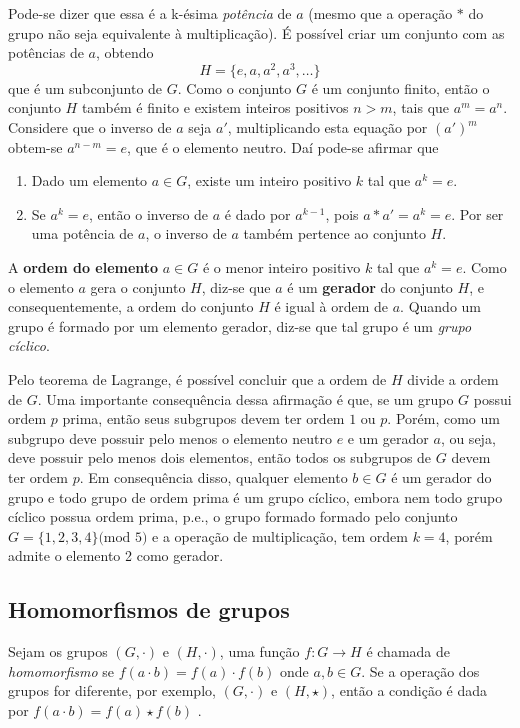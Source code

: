 Pode-se dizer que essa é a k-ésima \textit{potência} de $a$ (mesmo que a operação $*$ do grupo não seja equivalente à multiplicação). É possível criar um conjunto com as potências de $a$, obtendo
$$
H = \{e, a, a^2, a^3, \ldots\}
$$
que é um subconjunto de $G$. Como o conjunto $G$ é um conjunto finito, então o conjunto $H$ também é finito e existem inteiros positivos $n > m$, tais que $a^m = a^n$. Considere que o inverso de $a$ seja $a'$, multiplicando esta equação por $(a')^m$ obtem-se $a^{n-m} = e$, que é o elemento neutro.\cite{Coutinho:2014} Daí pode-se afirmar que
\begin{enumerate}
\item Dado um elemento $a \in G$, existe um inteiro positivo $k$ tal que $a^k = e$.
\item Se $a^k = e$, então o inverso de $a$ é dado por $a^{k-1}$, pois $a * a' = a^k = e$. Por ser uma potência de $a$, o inverso de $a$ também pertence ao conjunto $H$.
\end{enumerate}

A \textbf{ordem do elemento} $a \in G$ é o menor inteiro positivo $k$ tal que $a^k = e$. Como o elemento $a$ gera o conjunto $H$, diz-se que $a$ é um \textbf{gerador} do conjunto $H$, e consequentemente, a ordem do conjunto $H$ é igual à ordem de $a$. Quando um grupo é formado por um elemento gerador, diz-se que tal grupo é um \textit{grupo cíclico}. \cite{Coutinho:2014}

Pelo teorema de Lagrange, é possível concluir que a ordem de $H$ divide a ordem de $G$. Uma importante consequência dessa afirmação é que, se um grupo $G$ possui ordem $p$ prima, então seus subgrupos devem ter ordem $1$ ou $p$. Porém, como um subgrupo deve possuir pelo menos o elemento neutro $e$ e um gerador $a$, ou seja, deve possuir pelo menos dois elementos, então todos os subgrupos de $G$ devem ter ordem $p$. Em consequência disso, qualquer elemento $b \in G$ é um gerador do grupo e todo grupo de ordem prima é um grupo cíclico, embora nem todo grupo cíclico possua ordem prima, p.e., o grupo formado formado pelo conjunto $G=\{1,2,3,4\} \mbox{(mod 5)}$ e a operação de multiplicação, tem ordem $k = 4$, porém admite o elemento 2 como gerador. \cite{Coutinho:2014}

%
%
\subsection{Homomorfismos de grupos}
Sejam os grupos $(G, \cdot)$ e $(H, \cdot)$, uma função $f: G \rightarrow H$ é chamada de \textit{homomorfismo} se $f(a \cdot b) = f(a) \cdot f(b)$ onde $a, b \in G$. Se a operação dos grupos for diferente, por exemplo, $(G, \cdot)$ e $(H, \star)$, então a condição é dada por $f(a \cdot b) = f(a) \star f(b)$ \cite{Gilbert:2004}.

